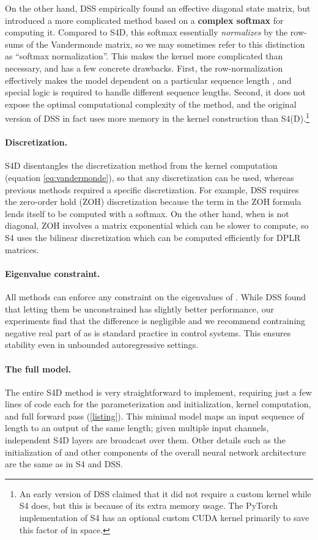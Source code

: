 \documentclass{article}
\newcommand{\para}[1]{\paragraph{#1}}
\begin{document}
On the other hand, DSS empirically found an effective diagonal state matrix, but introduced a more complicated method based on a \textbf{complex softmax} for computing it.
Compared to S4D, this softmax essentially \emph{normalizes} by the row-sums of the Vandermonde matrix, so we may sometimes refer to this distinction as ``softmax normalization''.
This makes the kernel more complicated than necessary, and has a few concrete drawbacks.
First, the row-normalization effectively makes the model dependent on a particular sequence length , and special logic is required to handle different sequence lengths.
Second, it does not expose the optimal computational complexity of the method, and the original version of DSS in fact uses  more memory in the kernel construction than S4(D).\footnote{An early version of DSS claimed that it did not require a custom kernel while S4 does, but this is because of its extra memory usage. The PyTorch implementation of S4 has an optional custom CUDA kernel primarily to save this factor of  in space.}



\para{Discretization.}

S4D disentangles the discretization method from the kernel computation (equation \eqref{eq:vandermonde}), so that any discretization can be used,
whereas previous methods required a specific discretization.
For example, DSS requires the zero-order hold (ZOH) discretization because the  term in the ZOH formula lends itself to be computed with a softmax.
On the other hand, when  is not diagonal, ZOH involves a matrix exponential which can be slower to compute, so S4 uses the bilinear discretization which can be computed efficiently for DPLR matrices.

\para{Eigenvalue constraint.}

All methods can enforce any constraint on the eigenvalues of . While DSS found that letting them be unconstrained has slightly better performance, our experiments find that the difference is negligible and we recommend contraining negative real part of  as is standard practice in control systems.
This ensures stability even in unbounded autoregressive settings.

\para{The full model.}

The entire S4D method is very straightforward to implement, requiring just a few lines of code each for the parameterization and initialization, kernel computation, and full forward pass (\cref{listing}).
This minimal model maps an input sequence of length  to an output of the same length; given multiple input channels, independent S4D layers are broadcast over them.
Other details such as the initialization of  and other components of the overall neural network architecture are the same as in S4 and DSS.
\end{document}
